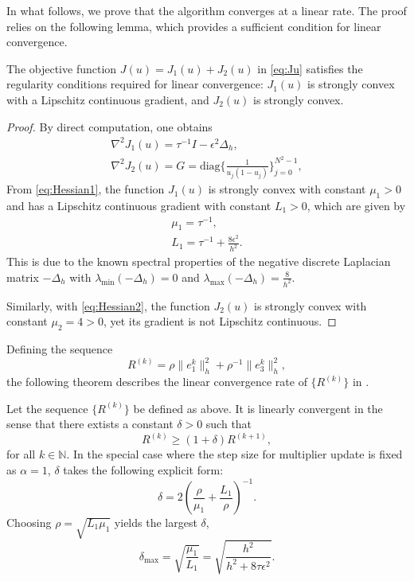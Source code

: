 In what follows, we prove that the algorithm converges at a linear rate. 
The proof relies on the following lemma, which provides a sufficient condition for linear convergence. 
\begin{lemma}\label{lm:J}
    The objective function $J(u)=J_1(u)+J_2(u)$ in \eqref{eq:Ju} satisfies the regularity conditions required for linear convergence: 
$J_1(u)$ is strongly convex with a Lipschitz continuous gradient, and $J_2(u)$ is strongly convex.
\end{lemma}
\begin{proof}
    By direct computation, one obtains
\begin{subequations}
\begin{align}
\label{eq:Hessian1}
\nabla^2J_1(u)=\tau^{-1}I-\epsilon^2\Delta_h,\\
\label{eq:Hessian2}
\nabla^2J_2(u)=G=\text{diag}\{\frac{1}{u_j(1-u_j)}\}_{j=0}^{N^2-1},
\end{align}
\end{subequations}
From \eqref{eq:Hessian1}, the function $J_1(u)$ is strongly convex with constant $\mu_1>0$ 
and has a Lipschitz continuous gradient with constant $L_1>0$, which are given by
\begin{align}
    \mu_1=\tau^{-1},\\
    L_1=\tau^{-1}+\frac{8\epsilon^2}{h^2}.
\end{align}
This is due to the known spectral properties of the negative discrete Laplacian matrix $-\Delta_h$ 
with $\lambda_{\min}(-\Delta_h)=0$ and $\lambda_{\max}(-\Delta_h)=\frac{8}{h^2}$.
\par Similarly, with \eqref{eq:Hessian2}, the function $J_2(u)$ is strongly convex with constant $\mu_2=4>0$, 
yet its gradient is not Lipschitz continuous.
\end{proof}
Defining the sequence 
\begin{equation}
R^{(k)}=\rho \|e_1^{k}\|_h^2+\rho^{-1}\|e_3^{k}\|_h^2, 
\end{equation}
the following theorem describes the linear convergence rate of $\{R^{(k)}\}$ in .
\begin{theorem}
Let the sequence $\{R^{(k)}\}$ be defined as above. It is linearly convergent in the sense that there extists a constant $\delta>0$ such that 
\begin{equation}
    R^{(k)}\geq (1+\delta) R^{(k+1)},
\end{equation}
for all $k\in \mathbb{N}$. In the special case where the step size for multiplier update is fixed as $\alpha=1$, $\delta$ takes the following explicit form:
\begin{equation}
\delta=2(\frac{\rho}{\mu_1}+\frac{L_1}{\rho})^{-1}.
\end{equation}
Choosing $\rho=\sqrt{L_1\mu_1}$ yields the largest $\delta$,
\begin{equation}
\delta_{\max}=\sqrt{\frac{\mu_1}{L_1}}=\sqrt{\frac{h^2}{h^2+8\tau \epsilon^2}}.
\end{equation}
\end{theorem}
